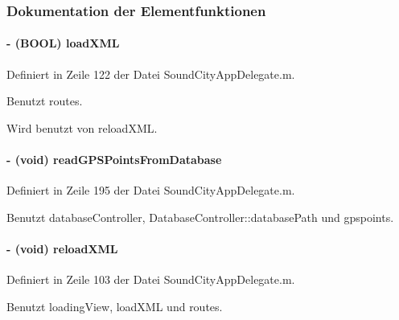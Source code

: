 \subsubsection{Dokumentation der Elementfunktionen}
\hypertarget{interface_sound_city_app_delegate_a7aa1b9b78348047311af130f2714596f}{
\paragraph[{loadXML}]{\setlength{\rightskip}{0pt plus 5cm}-\/ (BOOL) loadXML }\hfill}
\label{interface_sound_city_app_delegate_a7aa1b9b78348047311af130f2714596f}


Definiert in Zeile 122 der Datei SoundCityAppDelegate.m.

Benutzt routes.

Wird benutzt von reloadXML.\hypertarget{interface_sound_city_app_delegate_ac8941fa34f517a66ec3db85d928ba0a0}{
\paragraph[{readGPSPointsFromDatabase}]{\setlength{\rightskip}{0pt plus 5cm}-\/ (void) readGPSPointsFromDatabase }\hfill}
\label{interface_sound_city_app_delegate_ac8941fa34f517a66ec3db85d928ba0a0}


Definiert in Zeile 195 der Datei SoundCityAppDelegate.m.

Benutzt databaseController, DatabaseController::databasePath und gpspoints.\hypertarget{interface_sound_city_app_delegate_ab52c63a7c4dcb1303a96f4acd3f4db0f}{
\paragraph[{reloadXML}]{\setlength{\rightskip}{0pt plus 5cm}-\/ (void) reloadXML }\hfill}
\label{interface_sound_city_app_delegate_ab52c63a7c4dcb1303a96f4acd3f4db0f}


Definiert in Zeile 103 der Datei SoundCityAppDelegate.m.

Benutzt loadingView, loadXML und routes.

